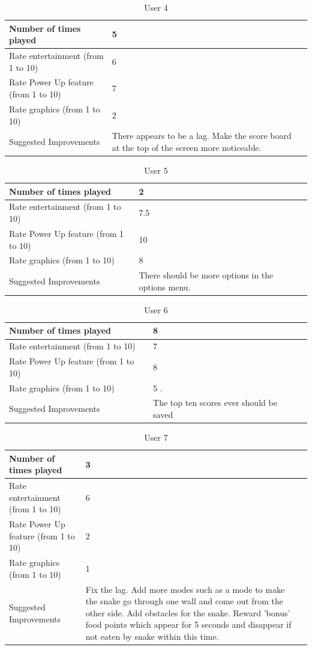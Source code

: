 \documentclass[12pt]{article}
\begin{document}
\begin{center}
	\begin{longtable}{ | l | p{8cm} | p{8cm}|}
	\caption{User 4} \\ \hline \label{TblUsr4} 
	Number of times played & 5 \\ \hline
	Rate entertainment (from 1 to 10) & 6 \\ \hline
	Rate Power Up feature (from 1 to 10) & 7 \\ \hline
	Rate graphics (from 1 to 10) & 2  \\ \hline
	Suggested Improvements & There appears to be a lag. Make the score board at the top of the screen more noticeable.\\ \hline
	\end{longtable}

	\begin{longtable}{ | l | p{8cm} | p{8cm}|}
	\caption{User 5} \\ \hline \label{TblUsr5} 
	Number of times played & 2 \\ \hline
	Rate entertainment (from 1 to 10) & 7.5 \\ \hline
	Rate Power Up feature (from 1 to 10) & 10 \\ \hline
	Rate graphics (from 1 to 10) & 8 \\ \hline
	Suggested Improvements & There should be more options in the options menu. \\ \hline
	\end{longtable}

	\begin{longtable}{ | l | p{8cm} | p{8cm}|}
	\caption{User 6}  \\ \hline \label{TblUsr6} 
	Number of times played &  8 \\ \hline
	Rate entertainment (from 1 to 10) & 7 \\ \hline
	Rate Power Up feature (from 1 to 10) & 8 \\ \hline
	Rate graphics (from 1 to 10) & 5  .\\ \hline
	Suggested Improvements & The top ten scores ever should be saved \\ \hline
	\end{longtable}

	\begin{longtable}{ | l | p{8cm} | p{8cm}|}
	\caption{User 7} \\ \hline \label{TblUsr7} 
	Number of times played & 3 \\ \hline
	Rate entertainment (from 1 to 10) & 6 \\ \hline
	Rate Power Up feature (from 1 to 10) & 2 \\ \hline
	Rate graphics (from 1 to 10) & 1 \\ \hline
	Suggested Improvements & Fix the lag. Add more modes such as a 			mode to make the snake go through one wall and come out from the 		other side. Add obstacles for the snake. Reward 'bonus' food 			points which appear for 5 seconds and disappear if not eaten by 		snake within this time. \\ \hline
	\end{longtable}
\end{center}
\newpage
\end{document}
